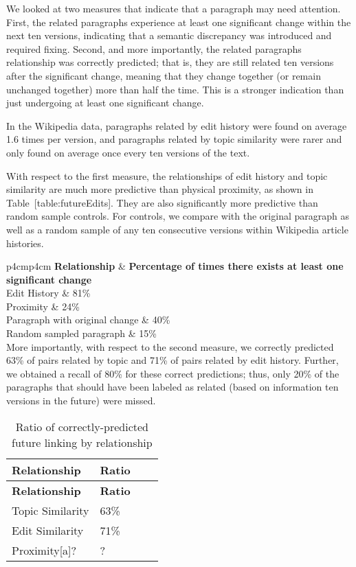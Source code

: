 We looked at two measures that indicate that a paragraph may need
attention. First, the related paragraphs experience at least one
significant change within the next ten versions, indicating that a
semantic discrepancy was introduced and required fixing. Second, and
more importantly, the related paragraphs relationship was correctly
predicted; that is, they are still related ten versions after the
significant change, meaning that they change together (or remain
unchanged together) more than half the time. This is a stronger
indication than just undergoing at least one significant change.

In the Wikipedia data, paragraphs related by edit history were found on
average 1.6 times per version, and paragraphs related by topic
similarity were rarer and only found on average once every ten versions
of the text.

With respect to the first measure, the relationships of edit history and
topic similarity are much more predictive than physical proximity, as
shown in Table~{[}table:futureEdits{]}. They are also significantly more
predictive than random sample controls. For controls, we compare with
the original paragraph as well as a random sample of any ten consecutive
versions within Wikipedia article histories.

{\textbar{}p{4cm}\textbar{}p{4cm}\textbar{}} \textbf{Relationship} \&
\textbf{Percentage of times there exists at least one significant
change}\\Edit History \& 81\%\\

Proximity \& 24\%\\

Paragraph with original change \& 40\%\\

Random sampled paragraph \& 15\%\\

More importantly, with respect to the second measure, we correctly
predicted 63\% of pairs related by topic and 71\% of pairs related by
edit history. Further, we obtained a recall of 80\% for these correct
predictions; thus, only 20\% of the paragraphs that should have been
labeled as related (based on information ten versions in the future)
were missed.

\begin{longtable}[c]{@{}llll@{}}
\caption{Ratio of correctly-predicted future linking by
relationship{}}\tabularnewline
\toprule
\textbf{Relationship} & \textbf{Ratio} & &\tabularnewline
\midrule
\endfirsthead
\toprule
\textbf{Relationship} & \textbf{Ratio} & &\tabularnewline
\midrule
\endhead
Topic Similarity & 63\% & &\tabularnewline
Edit Similarity & 71\% & &\tabularnewline
Proximity{[}a{]}? & ? & &\tabularnewline
\bottomrule
\end{longtable}

